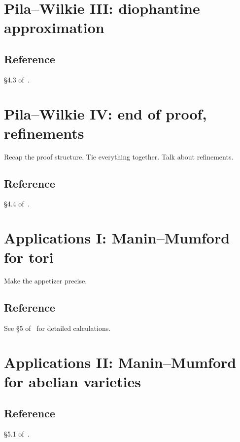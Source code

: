 \documentclass[10pt, a4paper]{amsart}
\begin{document}
\section{Pila--Wilkie III: diophantine approximation}

\subsection*{Reference} \S4.3 of~\cite{scanlon}.

\section{Pila--Wilkie IV: end of proof, refinements}

Recap the proof structure.
Tie everything together.
Talk about refinements.

\subsection*{Reference} \S4.4 of~\cite{scanlon}.

\section{Applications I: Manin--Mumford for tori}

Make the appetizer precise.

\subsection*{Reference}
See \S5 of~\cite{csp} for detailed calculations.

\section{Applications II: Manin--Mumford for abelian varieties}

\subsection*{Reference} \S5.1 of~\cite{scanlon}.

\printbibliography
\end{document}
